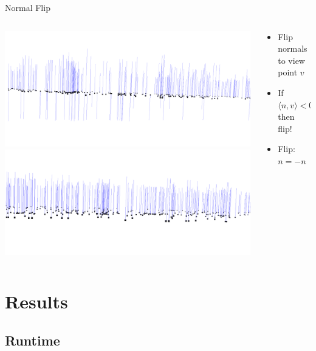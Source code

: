 \documentclass{beamer}
\begin{document}
\begin{frame}{Normal Flip}
	\begin{columns}
		\begin{column}{0.5\textwidth}
 			\includegraphics[width=1.0\textwidth]{normal_flip.png}\\
			\includegraphics[width=1.0\textwidth]{normals.png}
		\end{column}
		\begin{column}{0.5\textwidth}
			\begin{itemize}
				\item Flip normals to view point $v$
				\item If $\langle n,v \rangle < 0$ then flip! 
				\item Flip: $n = -n$
			\end{itemize}
		\end{column}
	\end{columns}
\end{frame}

\section{Results}

\subsection*{Runtime}
\end{document}
